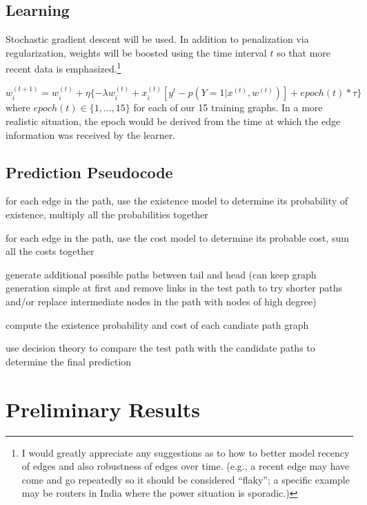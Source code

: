 \documentclass{article} %
\begin{document}
\subsection{Learning}

Stochastic gradient descent will be used.  In addition to penalization via
regularization, weights will be boosted using the time interval $t$ so that more
recent data is emphasized.\footnote{I would greatly appreciate any
  suggestions as to how to better model recency of edges and also robustness
  of edges over time.  (e.g., a recent edge may have come and go repeatedly so it
  should be considered ``flaky''; a specific example may be routers in India
  where the power situation is sporadic.)}

\begin{displaymath}
w_i^{(t+1)} = w_i^{(t)} + \eta \{- \lambda w_i^{(t)} + x_i^{(t)} [ y^t -  p(Y=1|x^{(t)},w^{(t)})] + epoch(t)*\tau \}
\end{displaymath}
where $epoch(t) \in \{ 1,...,15 \}$ for each of our 15 training graphs.  In a more realistic situation, the epoch would be derived from the time at
which the edge information was received by the learner.

\subsection{Prediction Pseudocode}

\textsf{\small for each edge in the path, use the existence model to determine its probability of existence, multiply all the probabilities together}

\textsf{\small for each edge in the path, use the cost model to determine its probable cost, sum all the costs together}

\textsf{\small generate additional possible paths between tail and head (can keep graph generation simple at first and remove links in the test path to try shorter paths and/or replace intermediate nodes in the path with nodes of high degree)}

\textsf{\small compute the existence probability and cost of each candiate path graph}

\textsf{\small use decision theory to compare the test path with the candidate paths to determine the final prediction}

\section{Preliminary Results}
\end{document}
